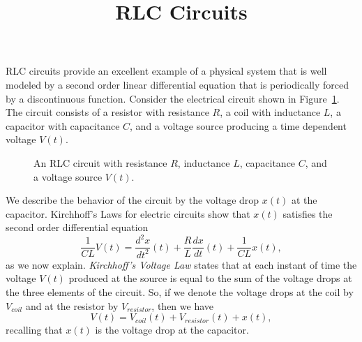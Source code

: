\documentclass{ximera}
\title{RLC Circuits}
\begin{document}
\begin{abstract}
\end{abstract}
\maketitle

  \label{S:SOFE}

RLC circuits provide an excellent example of a physical system that is well
modeled by a second order linear differential equation that is periodically 
forced by a discontinuous function.  Consider the electrical circuit shown in 
Figure~\ref{fig:rcl}.  The circuit consists of a resistor with
resistance $R$, a coil with inductance $L$, a 
capacitor with 
capacitance $C$, and a voltage source producing a time 
dependent voltage $V(t)$.    
\begin{figure}[htb]
           \centerline{%
           }
           \caption{An RLC circuit with resistance $R$, inductance $L$,
	   capacitance $C$, and a voltage source $V(t)$.}
           \label{fig:rcl}
\end{figure}

We describe the behavior of the circuit by the voltage drop $x(t)$ at the 
capacitor.  Kirchhoff's Laws 
for electric circuits show that $x(t)$ satisfies 
the second order differential equation
\begin{equation}  \label{e:eleccirc}
\frac{1}{CL}V(t) = \frac{d^2x}{dt^2}(t) + \frac{R}{L}\frac{dx}{dt}(t) + 
\frac{1}{CL}x(t),
\end{equation}
as we now explain.   {\em Kirchhoff's Voltage 
Law\/} states that at each
instant of time the voltage $V(t)$ produced at the source is
equal to the sum of the voltage drops at the three elements of
the circuit.  So, if we denote the voltage drops at the coil
by $V_{coil}$ and at the resistor by $V_{resistor}$, then 
we have 
\begin{equation}  \label{e:kirchhoff}
V(t) = V_{coil}(t) + V_{resistor}(t) + x(t),
\end{equation}
recalling that $x(t)$ is the voltage drop at the capacitor.
\end{document}
